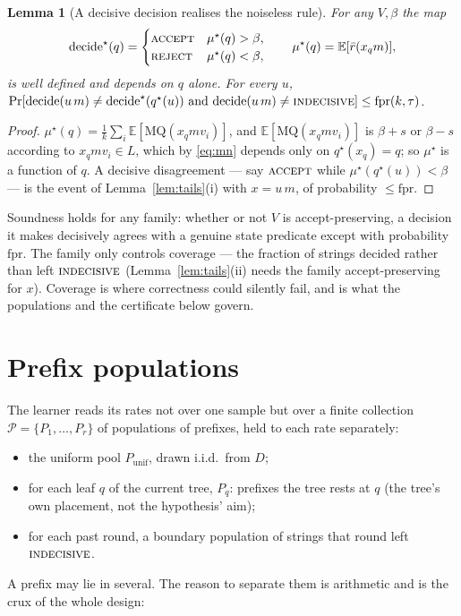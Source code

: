\documentclass[11pt]{article}
\newtheorem{lemma}{Lemma}
\newcommand{\MQ}{\mathrm{MQ}}
\newcommand{\acc}{\textsc{accept}}
\newcommand{\rej}{\textsc{reject}}
\newcommand{\ind}{\textsc{indecisive}}
\newcommand{\fpr}{\mathrm{fpr}}
\begin{document}
\begin{lemma}[A decisive decision realises the noiseless rule]\label{lem:decisive}
For any $V,\beta$ the map
\[
  \mathrm{decide}^\star(q)=\begin{cases}\acc & \mu^\star(q)>\beta,\\ \rej & \mu^\star(q)<\beta,\end{cases}
  \qquad \mu^\star(q)=\mathbb E[\bar r(x_q m)],
\]
is well defined and depends on $q$ alone. For every $u$,
$\Pr[\mathrm{decide}(u\,m)\ne\mathrm{decide}^\star(q^\star(u))\text{ and }\mathrm{decide}(u\,m)\ne\ind]\le\fpr(k,\tau)$.
\end{lemma}
\begin{proof}
$\mu^\star(q)=\frac1k\sum_i\mathbb E[\MQ(x_q m v_i)]$, and $\mathbb E[\MQ(x_q m
v_i)]$ is $\beta+s$ or $\beta-s$ according to $x_q m v_i\in L$, which by
\eqref{eq:mn} depends only on $q^\star(x_q)=q$; so $\mu^\star$ is a function of $q$.
A decisive disagreement --- say $\acc$ while $\mu^\star(q^\star(u))<\beta$ --- is
the event of Lemma~\ref{lem:tails}(i) with $x=u\,m$, of probability $\le\fpr$.
\end{proof}

Soundness holds for {any} family: whether or not $V$ is accept-preserving, a
decision it makes decisively agrees with a genuine state predicate except with
probability $\fpr$. The family only controls {coverage} --- the fraction of
strings decided rather than left $\ind$ (Lemma~\ref{lem:tails}(ii) needs the
family accept-preserving for $x$). Coverage is where correctness could silently
fail, and is what the populations and the certificate below govern.

\section{Prefix populations}\label{sec:pops}

The learner reads its rates not over one sample but over a finite collection
$\mathcal P=\{P_1,\dots,P_r\}$ of populations of prefixes, held to each rate
separately:
\begin{itemize}
\item the uniform pool $P_{\mathrm{unif}}$, drawn i.i.d.\ from $D$;
\item for each leaf $q$ of the current tree, $P_q$: prefixes the tree rests at
$q$ (the tree's own placement, not the hypothesis' aim);
\item for each past round, a boundary population of strings that round left $\ind$.
\end{itemize}
A prefix may lie in several. The reason to separate them is arithmetic and is the
crux of the whole design:
\end{document}
